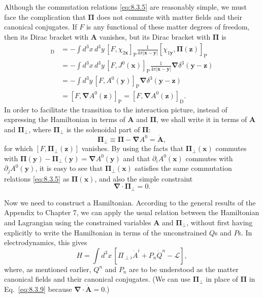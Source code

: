 Although the commutation relations \eqref{eq:8.3.5} are reasonably simple, we must
face the complication that $\boldsymbol\Pi$ does not commute with matter
fields and their canonical conjugates. If $F$ is any functional of these matter
degrees of freedom, then its Dirac bracket with $\mathbf A$ vanishes, but its
Dirac bracket with $\boldsymbol\Pi$ is
\begin{align*}
  [F,\boldsymbol\Pi(\mathbf z)]_{\mathrm D}
  &=-\int d^3x\,d^3y\,[F,\chi_{2\mathbf x}]_{\mathrm P}
  \frac{1}{4\pi\lvert\mathbf x-\mathbf y\rvert}
  [\chi_{1\mathbf y},\boldsymbol\Pi(\mathbf z)]_{\mathrm P}\\
  &=-\int d^3x\,d^3y\,[F,J^0(\mathbf x)]_{\mathrm P}
  \frac{1}{4\pi\lvert\mathbf x-\mathbf y\rvert}
  \boldsymbol\nabla\delta^3(\mathbf y-\mathbf z)\\
  &=-\int d^3y\,[F,A^0(\mathbf y)]_{\mathrm P}
  \boldsymbol\nabla\delta^3(\mathbf y-\mathbf z)\\
  &=[F,\boldsymbol\nabla A^0(\mathbf z)]_{\mathrm P}
  =[F,\boldsymbol\nabla A^0(\mathbf z)]_{\mathrm D}.
\end{align*}
In order to facilitate the transition to the interaction picture, instead of
expressing the Hamiltonian in terms of $\mathbf A$ and $\boldsymbol\Pi$, we
shall write it in terms of $\mathbf A$ and $\boldsymbol\Pi_\perp$, where
$\boldsymbol\Pi_\perp$ is the solenoidal part of $\boldsymbol\Pi$:
\begin{equation}
  \boldsymbol\Pi_\perp\equiv\boldsymbol\Pi-\boldsymbol\nabla A^0
  =\dot{\mathbf A},
  \tag{8.3.7}\label{eq:8.3.7}
\end{equation}
for which $[F,\boldsymbol\Pi_\perp(\mathbf z)]$ vanishes. By using the facts
that $\boldsymbol\Pi_\perp(\mathbf x)$ commutes with
$\boldsymbol\Pi(\mathbf y)-\boldsymbol\Pi_\perp(\mathbf y)
=\boldsymbol\nabla A^0(\mathbf y)$ and that $\partial_iA^0(\mathbf x)$
commutes with $\partial_jA^0(\mathbf y)$, it is easy to see that
$\boldsymbol\Pi_\perp(\mathbf x)$ satisfies the same commutation relations
\eqref{eq:8.3.5} as $\boldsymbol\Pi(\mathbf x)$, and also the simple constraint
\begin{equation}
  \boldsymbol\nabla\cdot\boldsymbol\Pi_\perp=0.
  \tag{8.3.8}\label{eq:8.3.8}
\end{equation}

Now we need to construct a Hamiltonian. According to the general results of
the Appendix to Chapter 7, we can apply the usual relation between the
Hamiltonian and Lagrangian using the constrained variables $\mathbf A$ and
$\boldsymbol\Pi_\perp$, without first having explicitly to write the
Hamiltonian in terms of the unconstrained $Q$s and $P$s. In electrodynamics,
this gives
\begin{equation}
  H=\int d^3x\,[\Pi_{\perp i}\dot A^i+P_n\dot Q^n-\mathcal L],
  \tag{8.3.9}\label{eq:8.3.9}
\end{equation}
where, as mentioned earlier, $Q^n$ and $P_n$ are to be understood as the
matter canonical fields and their canonical conjugates. (We can use
$\boldsymbol\Pi_\perp$ in place of $\boldsymbol\Pi$ in Eq.~\eqref{eq:8.3.9} because
$\boldsymbol\nabla\cdot\dot{\mathbf A}=0$.)

